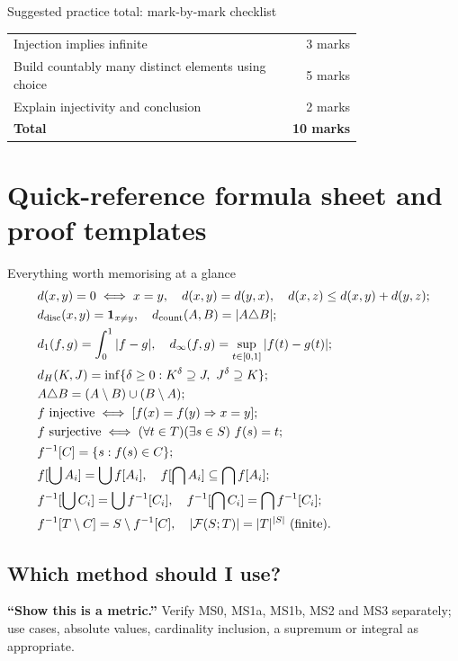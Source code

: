 \documentclass[11pt,a4paper]{article}
\begin{document}
\begin{tipbox}{Suggested practice total: mark-by-mark checklist}
\begin{tabular}{@{}p{0.77\linewidth}r@{}}
Injection implies infinite & 3 marks \\
Build countably many distinct elements using choice & 5 marks \\
Explain injectivity and conclusion & 2 marks \\
\hline\textbf{Total} & \textbf{10 marks}\\
\end{tabular}
\end{tipbox}
\newpage\section{Quick-reference formula sheet and proof templates}
\begin{keybox}{Everything worth memorising at a glance}
\begin{align*}
&d(x,y)=0\iff x=y,\quad d(x,y)=d(y,x),\quad d(x,z)\le d(x,y)+d(y,z);\\
&d_{\rm disc}(x,y)=\mathbf1_{x\ne y},\quad d_{\rm count}(A,B)=|A\triangle B|;\\
&d_1(f,g)=\int_0^1|f-g|,\quad d_\infty(f,g)=\sup_{t\in[0,1]}|f(t)-g(t)|;\\
&d_H(K,J)=\inf\{\delta\ge0:K^\delta\supseteq J,\ J^\delta\supseteq K\};\\
&A\triangle B=(A\setminus B)\cup(B\setminus A);\\
&f\text{ injective}\iff[f(x)=f(y)\Rightarrow x=y];\\
&f\text{ surjective}\iff (\forall t\in T)(\exists s\in S)\ f(s)=t;\\
&f^{-1}[C]=\{s:f(s)\in C\};\\
&f[\bigcup A_i]=\bigcup f[A_i],\quad f[\bigcap A_i]\subseteq\bigcap f[A_i];\\
&f^{-1}[\bigcup C_i]=\bigcup f^{-1}[C_i],\quad f^{-1}[\bigcap C_i]=\bigcap f^{-1}[C_i];\\
&f^{-1}[T\setminus C]=S\setminus f^{-1}[C],\quad |\mathcal F(S;T)|=|T|^{|S|}\ \text{(finite)}.
\end{align*}
\end{keybox}
\subsection{Which method should I use?}
\textbf{``Show this is a metric.''} Verify MS0, MS1a, MS1b, MS2 and MS3 separately; use cases, absolute values, cardinality inclusion, a supremum or integral as appropriate.
\end{document}
